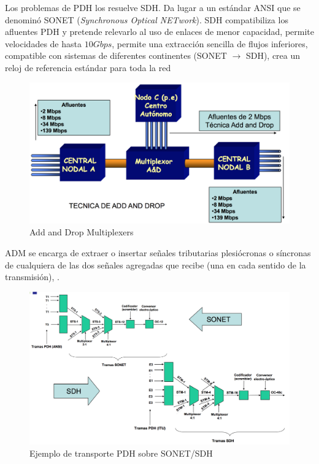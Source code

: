 \documentclass[10pt,portrait, twocolumn]{article}
\makeatletter
\renewcommand{\subsubsection}{\@startsection{subsubsection}{3}{0mm}%
                                {-1ex plus -.5ex minus -.2ex}%
                                {1ex plus .2ex}%
                                {\normalfont\small\bfseries}}
\makeatother
\begin{document}
Los problemas de PDH los resuelve SDH. Da lugar a un estándar ANSI que se denominó SONET (\textit{Synchronous Optical NETwork}). SDH compatibiliza los afluentes PDH y pretende relevarlo al uso de enlaces de menor capacidad, permite velocidades de hasta $10 Gbps$, permite una extracción sencilla de flujos inferiores, compatible con sistemas de diferentes continentes (SONET $\rightarrow$ SDH), crea un reloj de referencia estándar para toda la red


	\begin{figure}[!ht]
 		\centering
  		 \includegraphics[scale = 0.3]{images/AddDrop}
		\caption{Add and Drop Multiplexers}
	\end{figure}

ADM se encarga de extraer o insertar señales tributarias plesiócronas o síncronas de cualquiera de las dos señales agregadas que recibe (una en cada sentido de la transmisión), .



	
	\begin{figure}[!ht]
 		\centering
  		 \includegraphics[scale = 0.3]{images/EjemploTrans}
		\caption{Ejemplo de transporte PDH sobre SONET/SDH}
	\end{figure}
\end{document}
